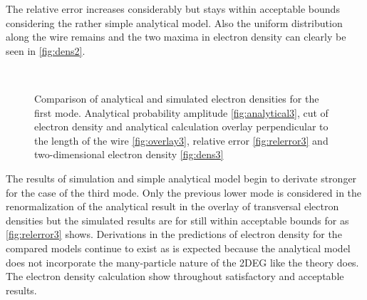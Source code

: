 The relative error increases considerably but stays within acceptable bounds considering the rather simple analytical model.
Also the uniform distribution along the wire remains and the two maxima in electron density can clearly be seen in \cref{fig:dens2}.\par
\begin{figure}[h]
  \begin{center}
 \qquad
    \\
    \qquad
    \caption{Comparison of analytical and simulated electron densities for the first mode. Analytical probability amplitude \ref{fig:analytical3}, cut of electron density and analytical calculation overlay perpendicular to the length of the wire \ref{fig:overlay3}, relative error \ref{fig:relerror3} and two-dimensional electron density \ref{fig:dens3}}\label{fig:mode3}
  \end{center}
\end{figure}
The results of simulation and simple analytical model begin to derivate stronger for the case of the third mode. Only the previous lower mode is considered in the renormalization of the analytical result in the overlay of transversal electron densities but the simulated results are for still within acceptable bounds for as \cref{fig:relerror3} shows. Derivations in the predictions of electron density for the compared models continue to exist as is expected because the analytical model does not incorporate the many-particle nature of the 2DEG like the \gfnc{} theory does.
The electron density calculation show throughout satisfactory and acceptable results.\par
\FloatBarrier

